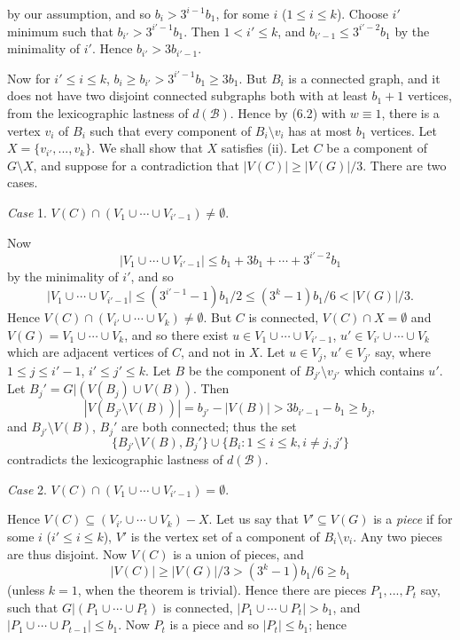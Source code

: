 \noindent by our assumption, and so $b_i>3^{i-1}b_1$, for some $i$ ($1\le i\le k$). Choose $i'$ minimum such that $b_{i'}>3^{i'-1}b_1$. Then $1<i'\le k$, and $b_{i'-1}\le 3^{i'-2}b_1$ by the minimality of $i'$. Hence $b_{i'}>3b_{i'-1}$.

Now for $i'\le i\le k$, $b_i\ge b_{i'}>3^{i'-1}b_1\ge 3b_1$. But $B_i$ is a connected graph, and it does not have two disjoint connected subgraphs both with at least $b_1+1$ vertices, from the lexicographic lastness of $d(\mathcal{B})$. Hence by (6.2) with $w\equiv 1$, there is a vertex $v_i$ of $B_i$ such that every component of $B_i\setminus v_i$ has at most $b_1$ vertices. Let $X=\{v_{i'},..., v_k\}$. We shall show that $X$ satisfies (ii). Let $C$ be a component of $G\setminus X$, and suppose for a contradiction that $|V(C)|\ge |V(G)|/3$. There are two cases.

\textit{Case} 1. $V(C)\cap (V_1\cup\cdots\cup V_{i'-1})\ne \emptyset$.

Now
\begin{equation*}
|V_1\cup\cdots\cup V_{i'-1}| \le b_1 + 3b_1 + \cdots + 3^{i'-2}b_1
\end{equation*}
by the minimality of $i'$, and so
\begin{equation*}
|V_1\cup\cdots\cup V_{i'-1}| \le (3^{i'-1}-1)b_1/2 \le (3^k-1)b_1/6 < |V(G)|/3.
\end{equation*}
Hence $V(C)\cap (V_{i'}\cup\cdots\cup V_k)\ne \emptyset$. But $C$ is connected, $V(C)\cap X=\emptyset$ and $V(G)=V_1\cup\cdots\cup V_k$, and so there exist $u\in V_1\cup\cdots\cup V_{i'-1}$, $u'\in V_{i'}\cup\cdots\cup V_k$ which are adjacent vertices of $C$, and not in $X$. Let $u\in V_j$, $u'\in V_{j'}$ say, where $1\le j\le i'-1$, $i'\le j'\le k$. Let $B$ be the component of $B_{j'}\setminus v_{j'}$ which contains $u'$. Let $B_j'=G|(V(B_j)\cup V(B))$. Then
\begin{equation*}
|V(B_{j'}\setminus V(B))| = b_{j'} - |V(B)| > 3b_{i'-1} - b_1 \ge b_j,
\end{equation*}
and $B_{j'}\setminus V(B)$, $B_j'$ are both connected; thus the set
\begin{equation*}
\{B_{j'}\setminus V(B), B_j'\} \cup \{B_i\colon 1\le i\le k, i\ne j, j'\}
\end{equation*}
contradicts the lexicographic lastness of $d(\mathcal{B})$.

\textit{Case} 2. $V(C)\cap (V_1\cup\cdots\cup V_{i'-1})=\emptyset$.

Hence $V(C)\subseteq (V_{i'}\cup\cdots\cup V_k)-X$. Let us say that $V'\subseteq V(G)$ is a \textit{piece} if for some $i$ ($i'\le i\le k$), $V'$ is the vertex set of a component of $B_i\setminus v_i$. Any two pieces are thus disjoint. Now $V(C)$ is a union of pieces, and
\begin{equation*}
|V(C)|\ge |V(G)|/3 > (3^k-1)b_1/6 \ge b_1
\end{equation*}
(unless $k=1$, when the theorem is trivial). Hence there are pieces $P_1,..., P_t$ say, such that $G|(P_1\cup\cdots\cup P_t)$ is connected, $|P_1\cup\cdots\cup P_t|>b_1$, and $|P_1\cup\cdots\cup P_{t-1}|\le b_1$. Now $P_t$ is a piece and so $|P_t|\le b_1$; hence
